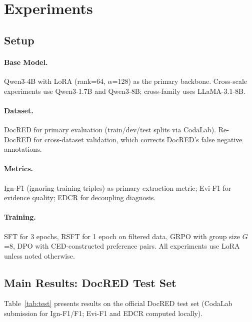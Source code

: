 \documentclass[11pt]{article}
\begin{document}
\section{Experiments}

\subsection{Setup}

\paragraph{Base Model.} Qwen3-4B with LoRA (rank=64, $\alpha$=128) as the primary backbone. Cross-scale experiments use Qwen3-1.7B and Qwen3-8B; cross-family uses LLaMA-3.1-8B.

\paragraph{Dataset.} DocRED for primary evaluation (train/dev/test splits via CodaLab). Re-DocRED for cross-dataset validation, which corrects DocRED's false negative annotations.

\paragraph{Metrics.} Ign-F1 (ignoring training triples) as primary extraction metric; Evi-F1 for evidence quality; EDCR for decoupling diagnosis.

\paragraph{Training.} SFT for 3 epochs, RSFT for 1 epoch on filtered data, GRPO with group size $G$=8, DPO with CED-constructed preference pairs. All experiments use LoRA unless noted otherwise.

\subsection{Main Results: DocRED Test Set}

Table~\ref{tab:test} presents results on the official DocRED test set (CodaLab submission for Ign-F1/F1; Evi-F1 and EDCR computed locally).
\end{document}
